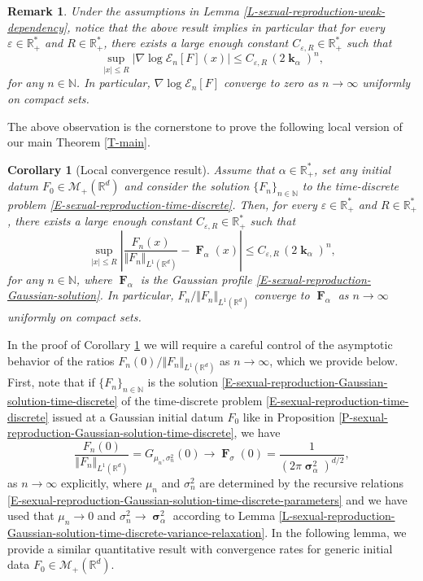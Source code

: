 \documentclass[reqno]{amsart}
\newtheorem{corollary}[definition]{Corollary}
\newtheorem{remark}[definition]{Remark}
\DeclareMathOperator{\bsigma}{\boldsymbol{\sigma}}
\DeclareMathOperator{\bF}{\boldsymbol{F}}
\DeclareMathOperator{\bk}{\boldsymbol{k}}
\numberwithin{equation}{section}
\begin{document}
{\begin{remark}\label{R-sexual-reproduction-local-convergence-expectations}
Under the assumptions in Lemma \ref{L-sexual-reproduction-weak-dependency}, notice that the above result implies in particular that for every $\varepsilon\in \mathbb{R}_+^*$ and $R\in \mathbb{R}_+^*$, there exists a large enough constant $C_{\varepsilon,R}\in \mathbb{R}_+^*$ such that
$$\sup_{\vert x\vert\leq R}\vert \nabla\log\mathcal{E}_n[F](x)\vert\leq C_{\varepsilon,R}\,(2\bk_\alpha)^n,$$
for any $n\in \mathbb{N}$. In particular, $\nabla\log \mathcal{E}_n[F]$ converge to zero as $n\rightarrow \infty$ uniformly on compact sets.
\end{remark}

The above observation is the cornerstone to prove the following local version of our main Theorem \ref{T-main}.

\begin{corollary}[Local convergence result]\label{C-sexual-reproduction-local-convergence}
Assume that $\alpha\in \mathbb{R}_+^*$, set any initial datum $F_0\in \mathcal{M}_+(\mathbb{R}^d)$ and consider the solution $\{F_n\}_{n\in \mathbb{N}}$ to the time-discrete problem \eqref{E-sexual-reproduction-time-discrete}. Then, for every $\varepsilon\in \mathbb{R}_+^*$ and $R\in \mathbb{R}_+^*$, there exists a large enough constant $C_{\varepsilon,R}\in \mathbb{R}_+^*$ such that
\begin{equation}\label{E-sexual-reproduction-local-convergence}
\sup_{\vert x\vert\leq R}\left\vert\frac{F_n(x)}{\Vert F_n\Vert_{L^1(\mathbb{R}^d)}}-\bF_\alpha(x)\right\vert\leq C_{\varepsilon,R}\,(2\bk_\alpha)^n,
\end{equation}
for any $n\in \mathbb{N}$, where $\bF_\alpha$ is the Gaussian profile \eqref{E-sexual-reproduction-Gaussian-solution}. In particular, $F_n/\Vert F_n\Vert_{L^1(\mathbb{R}^d)}$ converge to $\bF_\alpha$ as $n\rightarrow \infty$ uniformly on compact sets.
\end{corollary}

In the proof of Corollary \ref{C-sexual-reproduction-local-convergence} we will require a careful control of the asymptotic behavior of the ratios $F_n(0)/\Vert F_n\Vert_{L^1(\mathbb{R}^d)}$ as $n\rightarrow \infty$, which we provide below. First, note that if $\{F_n\}_{n\in \mathbb{N}}$ is the solution \eqref{E-sexual-reproduction-Gaussian-solution-time-discrete} of the time-discrete problem \eqref{E-sexual-reproduction-time-discrete} issued at a Gaussian initial datum $F_0$ like in Proposition \ref{P-sexual-reproduction-Gaussian-solution-time-discrete}, we have
$$\frac{F_n(0)}{\Vert F_n\Vert_{L^1(\mathbb{R}^d)}}=G_{\mu_n,\sigma_n^2}(0)\rightarrow \bF_\sigma(0)=\frac{1}{(2\pi\bsigma_\alpha^2)^{d/2}},$$
as $n\rightarrow \infty$ explicitly, where $\mu_n$ and $\sigma_n^2$ are determined by the recursive relations \eqref{E-sexual-reproduction-Gaussian-solution-time-discrete-parameters} and we have used that $\mu_n\rightarrow 0$ and $\sigma_n^2\rightarrow\bsigma_\alpha^2$ according to Lemma \ref{L-sexual-reproduction-Gaussian-solution-time-discrete-variance-relaxation}. In the following lemma, we provide a similar quantitative result with convergence rates for generic initial data $F_0\in \mathcal{M}_+(\mathbb{R}^d)$.

}
\end{document}
